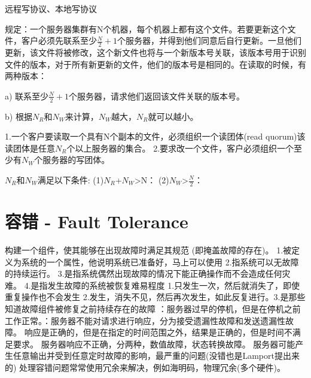 \documentclass[twoside]{ctexart}
\begin{document}
\begin{multicols}{2}
  
    远程写协议、本地写协议
  
   规定：一个服务器集群有N个机器，每个机器上都有这个文件。若要更新这个文件，客户必须先联系至少$\frac{N}{2}+1$个服务器，并得到他们同意后自行更新。一旦他们更新，该文件将被修改，这个新文件也将与一个新版本号关联，该版本号用于识别文件的版本，对于所有新更新的文件，他们的版本号是相同的。在读取的时候，有两种版本：
  
  a) 联系至少$\frac{N}{2}+1$个服务器，请求他们返回该文件关联的版本号。
  
  b) 根据$N_R$和$N_W$来计算，$N_W$越大，$N_R$就可以越小。
  
  1.一个客户要读取一个具有N个副本的文件，必须组织一个读团体(read quorum)该读团体是任意$N_R$个以上服务器的集合。
  2.要求改一个文件，客户必须组织一个至少有$N_W$个服务器的写团体。
  
  $N_R$和$N_W$满足以下条件:
  (1)$N_R$+$N_W$>N：
  (2)$N_W$>$\frac{N}{2}$：

  \section{容错 - Fault Tolerance}  构建一个组件，使其能够在出现故障时满足其规范 (即掩盖故障的存在)。 1.被定义为系统的一个属性，他说明系统已准备好，马上可以使用 2.指系统可以无故障的持续运行。 3.是指系统偶然出现故障的情况下能正确操作而不会造成任何灾难。 4.是指发生故障的系统被恢复难易程度 1.只发生一次，然后就消失了，即使重复操作也不会发生 2.发生，消失不见，然后再次发生，如此反复进行。3.是那些知道故障组件被修复之前持续存在的故障 ：服务器过早的停机，但是在停机之前工作正常。：服务器不能对请求进行响应，分为接受遗漏性故障和发送遗漏性故障。 响应是正确的，但是在指定的时间范围之外，结果是正确的，但是时间不满足要求。 服务器响应不正确，分两种，数值故障，状态转换故障。 服务器可能产生任意输出并受到任意定时故障的影响，最严重的问题(没错也是Lamport提出来的) 处理容错问题常常使用冗余来解决，例如海明码，物理冗余(多个硬件)。



\end{multicols}
\end{document}
